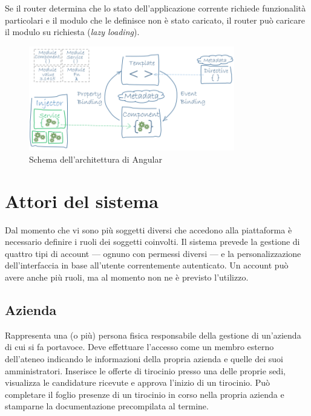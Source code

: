 Se il router determina che lo stato dell'applicazione corrente richiede funzionalità particolari e il modulo che le definisce non è stato caricato, il router può caricare il modulo su richiesta (\textit{lazy loading}).

\begin{figure}[!h] 
	\centering    
	\includegraphics[width=0.8\textwidth]{Chapter1/Figs/angular-overview}
	\caption[Architettura di Angular]{Schema dell'architettura di Angular\cite{angularoverview}}
	\label{fig:angular-overview}
\end{figure}

\section{Attori del sistema}

Dal momento che vi sono più soggetti diversi che accedono alla piattaforma è necessario definire i ruoli dei soggetti coinvolti. Il sistema prevede la gestione di quattro tipi di account --- ognuno con permessi diversi --- e la personalizzazione dell'interfaccia in base all'utente correntemente autenticato. Un account può avere anche più ruoli, ma al momento non ne è previsto l'utilizzo.

\subsection{Azienda}
Rappresenta una (o più) persona fisica responsabile della gestione di un'azienda di cui si fa portavoce.
Deve effettuare l'accesso come un membro esterno dell'ateneo indicando le informazioni della propria azienda e quelle dei suoi amministratori. Inserisce le offerte di tirocinio presso una delle proprie sedi, visualizza le candidature ricevute e approva l'inizio di un tirocinio. Può completare il foglio presenze di un tirocinio in corso nella propria azienda e stamparne la documentazione precompilata al termine. 

